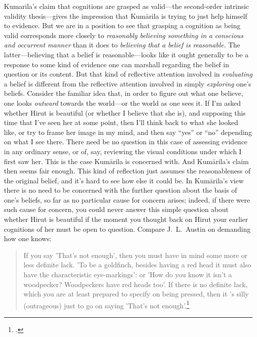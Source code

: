 ﻿\documentclass[11pt]{amsart}
\begin{document}
Kumarila's claim that cognitions are grasped as valid---the second-order intrinsic validity thesis---gives the impression that Kum\=arila is trying to just help himself to evidence. But we are in a position to see that grasping a cognition as being valid corresponds more closely to \emph{reasonably believing something in a conscious and occurrent manner} than it does to \emph{believing that a belief is reasonable.} The latter---believing that a belief is reasonable---looks like it ought generally to be a response to some kind of evidence one can marshall regarding the belief in question or its content. But that kind of reflective attention involved in \emph{evaluating} a belief is different from the reflective attention involved in simply \emph{exploring} one's beliefs. Consider the familiar idea that, in order to figure out what one believe, one looks \emph{outward} towards the world---or the world as one sees it. If I'm asked whether Hirut is beautiful (or whether I believe that she is), and supposing this time that I've seen her at some point, then I'll think back to what she looked like, or try to frame her image in my mind, and then say ``yes'' or ``no'' depending on what I see there. There need be no question in this case of assessing evidence in any ordinary sense, or of, say, reviewing the visual conditions under which I first saw her. This is the case Kum\=arila is concerned with. And Kum\=arila's claim then seems fair enough. This kind of reflection just assumes the reasonableness of the original belief, and it's hard to see how else it could be. In Kum\=arila's view there is no need to be concerned with the further question about the basis of one's beliefs, so far as no particular cause for concern arises; indeed, if there were such cause for concern, you could never answer this simple question about whether Hirut is beautiful if the moment you thought back on Hirut your earlier cognitions of her must be open to question. Compare J.~L.~Austin on demanding how one knows:\small\begin{quote}If you say 'That's not enough', then you must have in mind some more or less definite lack. 'To be a goldfinch, besides having a red head it must also have the characteristic eye-markings': or 'How do you know it isn't a woodpecker? Woodpeckers have red heads too'. If there is no definite lack, which you are at least prepared to specify on being pressed, then it 's silly (outrageous) just to go on saying 'That's not enough'.\footnote{\citet[p.~84]{austin1961other}.}\end{quote}\normalsize 
\end{document}
